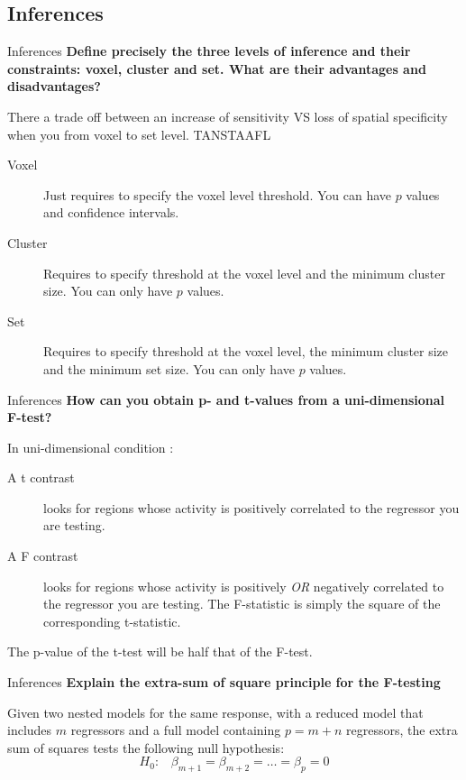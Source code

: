 \documentclass{beamer}
\begin{document}

\subsection[Inferences]{Inferences}

\begin{frame}{Inferences}
\textbf{Define precisely the three levels of inference and their constraints: voxel, cluster and set. What are their advantages and disadvantages?}

\smallskip
There a trade off between an increase of sensitivity VS loss of spatial specificity when you from voxel to set level. TANSTAAFL

  \begin{description}
    \item [Voxel] Just requires to specify the voxel level threshold. You can have $p$ values and confidence intervals.
    \item [Cluster] Requires to specify threshold at the voxel level and the minimum cluster size. You can only have $p$ values.
    \item [Set] Requires to specify threshold at the voxel level, the minimum cluster size and the minimum set size. You can only have $p$ values.
  \end{description}
\end{frame}

\begin{frame}{Inferences}
\textbf{How can you obtain p- and t-values from a uni-dimensional F-test?}

\smallskip
In uni-dimensional condition :

  \begin{description}
    \item [A t contrast] looks for regions whose activity is positively correlated to the regressor you are testing.
    \item [A F contrast] looks for regions whose activity is positively \emph{OR} negatively correlated to the regressor you are testing. The F-statistic is simply the square of the corresponding t-statistic.
  \end{description}

The p-value of the t-test will be half that of the F-test.
\end{frame}

\begin{frame}{Inferences}
\textbf{Explain the extra-sum of square principle for the F-testing}

\smallskip
Given two nested models for the same response, with a reduced model that includes $m$ regressors and a full model containing $ p = m + n $ regressors, the extra sum of squares tests the following null hypothesis:
  \begin{displaymath}
    H_{0} \mbox{:} \quad \beta_{m+1} = \beta_{m+2} = \dots = \beta_{p} = 0
  \end{displaymath}
\end{frame}
\end{document}
